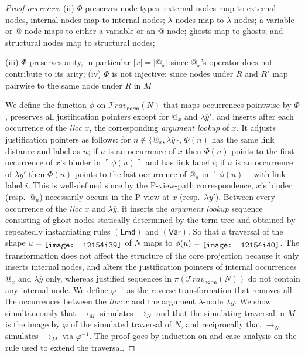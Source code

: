\documentclass[xchauthor,chkrefs,GCNS,amsmath,amsthm,rotating,leaveRGB]{tcsg}
\theoremstyle{plain}
\theoremstyle{definition}
\newcommand\travset{\mathcal{T}\!rav}
\newcommand{\normalizing}{\mathsf{norm}}
\newcommand{\travsetnorm}{\travset_{\normalizing}}
\def\coresymbol{\pi}
\begin{document}
\begin{proof}[Proof overview]
(ii) $\Phi $ preserves node types: external nodes map to external nodes,
internal nodes map to internal nodes; $\lambda $-nodes map to $\lambda
$-nodes; a variable or @-node maps to either a variable or an @-node; ghosts
map to ghosts; and structural nodes map to structural nodes;

(iii) $\Phi $ preserves arity, in particular $|x| = |@_{x}|$ since $@_{x}$'s
operator does not contribute to its arity; (iv) $\Phi $ is not injective:
since nodes under $R$ and $R'$ map pairwise to the same node under $R$ in
$M$

We define the function $\phi $ on $\travsetnorm (N)$ that maps occurrences
pointwise by $\Phi $, preserves all justification pointers except for $@_{x}$
and $\lambda \overline{y}'$, and inserts after each occurrence of the
\emph{lloc} $x$, the corresponding \emph{argument lookup} of $x$. It adjusts
justification pointers as follows: for $n\notin \{ @_{x}, \lambda
\overline{y} \}$, $\Phi (n)$ has the same link distance and label as $n$; if
$n$ is an occurrence of $x$ then $\Phi (n)$ points to the first occurrence of
$x$'s binder in $\ulcorner  \phi  (u) \urcorner  $ and has link label $i$; if
$n$ is an occurrence of $\lambda \overline{y}'$ then  $\Phi (n)$ points to
the last occurrence of $@_{a}$ in $\ulcorner  \phi  (u) \urcorner  $ with
link label $i$. This is well-defined since by the P-view-path correspondence,
$x$'s binder (resp.\ $@_{a}$) necessarily occurs in the P-view at $x$ (resp.\
$\lambda \overline{y}'$). Between every occurrence of the \emph{lloc} $x$ and
$\lambda \overline{y}$, it inserts the \emph{argument lookup} sequence
consisting of ghost nodes statically determined by the term tree and obtained
by repeatedly instantiating rules $\mathsf{(Lmd)}$ and $\mathsf{(Var)}$. So
that a traversal of the shape $u = \raisebox{-2pt}{\texttt{[image: 12154i39]}}$ of $N$ maps to
$\phi (u) = \raisebox{-2pt}{\texttt{[image: 12154i40]}}$. The transformation does not affect
the structure of the core projection because it only inserts internal nodes,
and alters the justification pointers of internal occurrences $@_{x}$ and
$\lambda \overline y$ only, whereas justified sequences in $\coresymbol
(\travsetnorm (N))$ do not contain any internal node. We define $\varphi
^{-1}$ as the reverse transformation that removes all the occurrences between
the \emph{lloc} $x$ and the  argument $\lambda $-node $\lambda \overline{y}$.
We show simultaneously that $\rightarrow _{M}$ simulates $\rightarrow _{N}$
and that the simulating traversal in $M$ is the image by $\varphi $ of the
simulated traversal of $N$, and reciprocally that $\rightarrow _{N}$
simulates $\rightarrow _{M}$ via $\varphi ^{-1}$. The proof goes by induction
on and case analysis on the rule used to extend the traversal.





\end{proof}
\end{document}
